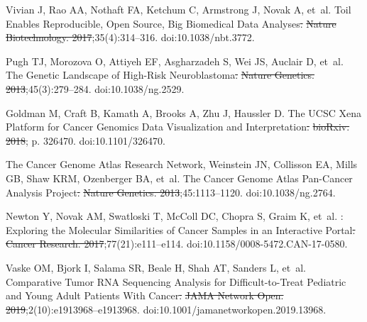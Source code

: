 \documentclass[10pt,letterpaper]{article}
\providecommand{\DIFdeltex}[1]{{\protect\color{red}\sout{#1}}}                      %
\providecommand{\DIFdelbegin}{} %
\providecommand{\DIFdelend}{} %
\providecommand{\DIFdel}[1]{\texorpdfstring{\DIFdeltex{#1}}{}} %
\newcommand{\DIFscaledelfig}{0.5}
\newlength{\DIFdelgraphicswidth} %
\newlength{\DIFdelgraphicsheight} %
\newcommand{\DIFdelincludegraphics}[2][]{%
\sbox{\DIFdelgraphicsbox}{\DIFOincludegraphics[#1]{#2}}%
\settoboxwidth{\DIFdelgraphicswidth}{\DIFdelgraphicsbox} %
\settoboxtotalheight{\DIFdelgraphicsheight}{\DIFdelgraphicsbox} %
\scalebox{\DIFscaledelfig}{%
\parbox[b]{\DIFdelgraphicswidth}{\usebox{\DIFdelgraphicsbox}\\[-\baselineskip] \rule{\DIFdelgraphicswidth}{0em}}\llap{\resizebox{\DIFdelgraphicswidth}{\DIFdelgraphicsheight}{%
\setlength{\unitlength}{\DIFdelgraphicswidth}%
\begin{picture}(1,1)%
\thicklines\linethickness{2pt} %
{\color[rgb]{1,0,0}\put(0,0){\framebox(1,1){}}}%
{\color[rgb]{1,0,0}\put(0,0){\line( 1,1){1}}}%
{\color[rgb]{1,0,0}\put(0,1){\line(1,-1){1}}}%
\end{picture}%
}\hspace*{3pt}}} %
} %
\DeclareRobustCommand{\DIFdelbegin}{\DIFOdelbegin \let\includegraphics\DIFdelincludegraphics} %
\DeclareRobustCommand{\DIFdelend}{\DIFOaddend \let\includegraphics\DIFOincludegraphics} %
\begin{document}
\begin{thebibliography}{10}

	Vivian J, Rao AA, Nothaft FA, Ketchum C, Armstrong J, Novak A, et~al.
	\newblock Toil Enables Reproducible, Open Source, Big Biomedical Data
	Analyses\DIFdelbegin \DIFdel{.
	}%
\DIFdel{Nature Biotechnology. 2017}\DIFdelend ;35(4):314--316.
	\newblock doi:{10.1038/nbt.3772}.

	Pugh TJ, Morozova O, Attiyeh EF, Asgharzadeh S, Wei JS, Auclair D, et~al.
	\newblock The Genetic Landscape of High-Risk Neuroblastoma\DIFdelbegin \DIFdel{.
	}%
\DIFdel{Nature Genetics. 2013}\DIFdelend ;45(3):279--284.
	\newblock doi:{10.1038/ng.2529}.

	Goldman M, Craft B, Kamath A, Brooks A, Zhu J, Haussler D.
	\newblock The {{UCSC Xena Platform}} for Cancer Genomics Data Visualization and
	Interpretation\DIFdelbegin \DIFdel{.
	}%
\DIFdel{bioRxiv. 2018}\DIFdelend ; p. 326470.
	\newblock doi:{10.1101/326470}.

	{The Cancer Genome Atlas Research Network}, Weinstein JN, Collisson EA, Mills
	GB, Shaw KRM, Ozenberger BA, et~al.
	\newblock The {{Cancer Genome Atlas Pan}}-{{Cancer}} Analysis
	Project\DIFdelbegin \DIFdel{.
	}%
\DIFdel{Nature Genetics. 2013}\DIFdelend ;45:1113--1120.
	\newblock doi:{10.1038/ng.2764}.

	Newton Y, Novak AM, Swatloski T, McColl DC, Chopra S, Graim K, et~al.
	: {{Exploring}} the {{Molecular Similarities}} of
	{{Cancer Samples}} in an {{Interactive Portal}}\DIFdelbegin \DIFdel{.
	}%
\DIFdel{Cancer Research. 2017}\DIFdelend ;77(21):e111--e114.
	\newblock doi:{10.1158/0008-5472.CAN-17-0580}.

	Vaske OM, Bjork I, Salama SR, Beale H, Shah AT, Sanders L, et~al.
	\newblock Comparative {{Tumor RNA Sequencing Analysis}} for
	{{Difficult}}-to-{{Treat Pediatric}} and {{Young Adult Patients With
			Cancer}}\DIFdelbegin \DIFdel{.
	}%
\DIFdel{JAMA Network Open. 2019}\DIFdelend ;2(10):e1913968--e1913968.
	\newblock doi:{10.1001/jamanetworkopen.2019.13968}.


\end{thebibliography}
\end{document}
